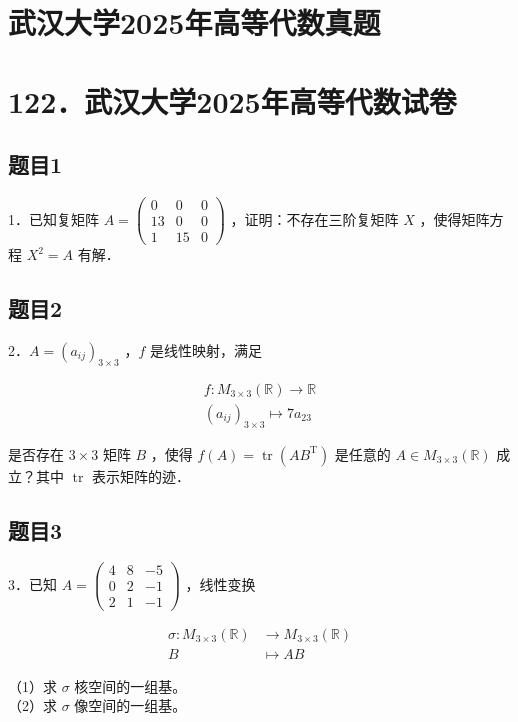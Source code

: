 \documentclass{article}
\begin{document}
\section*{武汉大学2025年高等代数真题}
\section*{122．武汉大学2025年高等代数试卷}

\subsection{题目1}
1．已知复矩阵 \(A=\left(\begin{array}{ccc}0 & 0 & 0 \\ 13 & 0 & 0 \\ 1 & 15 & 0\end{array}\right)\) ，证明：不存在三阶复矩阵 \(X\) ，使得矩阵方程 \(X^{2}=A\) 有解．

\subsection{题目2}
2．\(A=\left(a_{i j}\right)_{3 \times 3}\) ，\(f\) 是线性映射，满足

\[
\begin{gathered}
f: M_{3 \times 3}(\mathbb{R}) \rightarrow \mathbb{R} \\
\left(a_{i j}\right)_{3 \times 3} \mapsto 7 a_{23}
\end{gathered}
\]

是否存在 \(3 \times 3\) 矩阵 \(B\) ，使得 \(f(A)=\operatorname{tr}\left(A B^{\mathrm{T}}\right)\) 是任意的 \(A \in M_{3 \times 3}(\mathbb{R})\) 成立？其中 \(\operatorname{tr}\) 表示矩阵的迹．

\subsection{题目3}
3．已知 \(A=\left(\begin{array}{ccc}4 & 8 & -5 \\ 0 & 2 & -1 \\ 2 & 1 & -1\end{array}\right)\) ，线性变换

\[
\begin{aligned}
\sigma: M_{3 \times 3}(\mathbb{R}) & \rightarrow M_{3 \times 3}(\mathbb{R}) \\
B & \mapsto A B
\end{aligned}
\]

（1）求 \(\sigma\) 核空间的一组基。\\
（2）求 \(\sigma\) 像空间的一组基。
\end{document}

